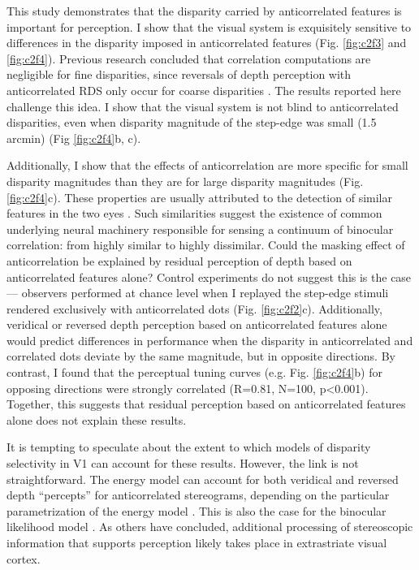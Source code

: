 This study demonstrates that the disparity carried by anticorrelated features is important for perception. I show that the visual system is exquisitely sensitive to differences in the disparity imposed in anticorrelated features (Fig. \ref{fig:c2f3} and \ref{fig:c2f4}). Previous research concluded that correlation computations are negligible for fine disparities, since reversals of depth perception with anticorrelated RDS only occur for coarse disparities \cite{Doi:2011ku}. The results reported here challenge this idea. I show that the visual system is not blind to anticorrelated disparities, even when disparity magnitude of the step-edge was small (1.5 arcmin) (Fig \ref{fig:c2f4}b, c).

Additionally, I show that the effects of anticorrelation are more specific for small disparity magnitudes than they are for large disparity magnitudes (Fig. \ref{fig:c2f4}c). These properties are usually attributed to the detection of similar features in the two eyes \cite{Badcock:1985ly,Lehky:1990fk,Stevenson:1992kx}. Such similarities suggest the existence of common underlying neural machinery responsible for sensing a continuum of binocular correlation: from highly similar to highly dissimilar.
Could the masking effect of anticorrelation be explained by residual perception of depth based on anticorrelated features alone? Control experiments do not suggest this is the case --- observers performed at chance level when I replayed the step-edge stimuli rendered exclusively with anticorrelated dots (Fig. \ref{fig:c2f2}c). Additionally, veridical or reversed depth perception based on anticorrelated features alone would predict differences in performance when the disparity in anticorrelated and correlated dots deviate by the same magnitude, but in opposite directions. By contrast, I found that the perceptual tuning curves (e.g. Fig. \ref{fig:c2f4}b) for opposing directions were strongly correlated (R=0.81, N=100, p<0.001). Together, this suggests that residual perception based on anticorrelated features alone does not explain these results.

It is tempting to speculate about the extent to which models of disparity selectivity in V1 can account for these results. However, the link is not straightforward. The energy model can account for both veridical and reversed depth ``percepts'' for anticorrelated stereograms, depending on the particular parametrization of the energy model \cite{Read:2002kx,Henriksen_2016}. This is also the case for the binocular likelihood model \cite{Goncalves:2017aa}. As others have concluded\cite{Cumming:1998ib,Janssen:2003fk}, additional processing of stereoscopic information that supports perception likely takes place in extrastriate visual cortex.

